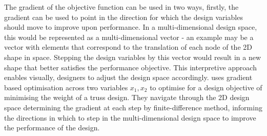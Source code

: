 \documentclass{article}
\begin{document}
The gradient of the objective function can be used in two ways, firstly, the gradient can be used to point in the direction for which the design variables should move to improve upon performance. In a multi-dimensional design space, this would be represented as a multi-dimensional vector - an example may be a vector with elements that correspond to the translation of each node of the 2D shape in space. Stepping the design variables by this vector would result in a new shape that better satisfies the performance objective. This interpretive approach enables visually, designers to adjust the design space accordingly. \cite{Brown:2018:2518-6582:1} uses gradient based optimisation across two variables $x_1,x_2$ to optimise for a design objective of minimising the weight of a truss design. They navigate through the 2D design space determining the gradient at each step by finite-difference method, informing the directions in which to step in the multi-dimensional design space to improve the performance of the design.
\end{document}
